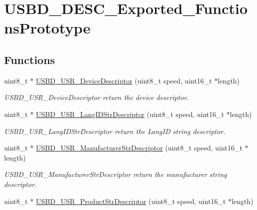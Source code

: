 \hypertarget{group__USBD__DESC__Exported__FunctionsPrototype}{\section{U\-S\-B\-D\-\_\-\-D\-E\-S\-C\-\_\-\-Exported\-\_\-\-Functions\-Prototype}
\label{group__USBD__DESC__Exported__FunctionsPrototype}
}
\subsection*{Functions}
\begin{DoxyCompactItemize}
\item 
uint8\-\_\-t $\ast$ \hyperlink{group__USBD__DESC__Exported__FunctionsPrototype_gadd5d311559f5cf53f393f9b863bd8aae}{U\-S\-B\-D\-\_\-\-U\-S\-R\-\_\-\-Device\-Descriptor} (uint8\-\_\-t speed, uint16\-\_\-t $\ast$length)
\begin{DoxyCompactList}\small\item\em U\-S\-B\-D\-\_\-\-U\-S\-R\-\_\-\-Device\-Descriptor return the device descriptor. \end{DoxyCompactList}\item 
uint8\-\_\-t $\ast$ \hyperlink{group__USBD__DESC__Exported__FunctionsPrototype_gab5247caa36187728a45c43078d96497e}{U\-S\-B\-D\-\_\-\-U\-S\-R\-\_\-\-Lang\-I\-D\-Str\-Descriptor} (uint8\-\_\-t speed, uint16\-\_\-t $\ast$length)
\begin{DoxyCompactList}\small\item\em U\-S\-B\-D\-\_\-\-U\-S\-R\-\_\-\-Lang\-I\-D\-Str\-Descriptor return the Lang\-I\-D string descriptor. \end{DoxyCompactList}\item 
uint8\-\_\-t $\ast$ \hyperlink{group__USBD__DESC__Exported__FunctionsPrototype_gaeb4b6e96436cb53ade2b8276568c27d1}{U\-S\-B\-D\-\_\-\-U\-S\-R\-\_\-\-Manufacturer\-Str\-Descriptor} (uint8\-\_\-t speed, uint16\-\_\-t $\ast$length)
\begin{DoxyCompactList}\small\item\em U\-S\-B\-D\-\_\-\-U\-S\-R\-\_\-\-Manufacturer\-Str\-Descriptor return the manufacturer string descriptor. \end{DoxyCompactList}\item 
uint8\-\_\-t $\ast$ \hyperlink{group__USBD__DESC__Exported__FunctionsPrototype_ga3e9f418a2337898da999ca7548c414a9}{U\-S\-B\-D\-\_\-\-U\-S\-R\-\_\-\-Product\-Str\-Descriptor} (uint8\-\_\-t speed, uint16\-\_\-t $\ast$length)

\end{DoxyCompactItemize}
